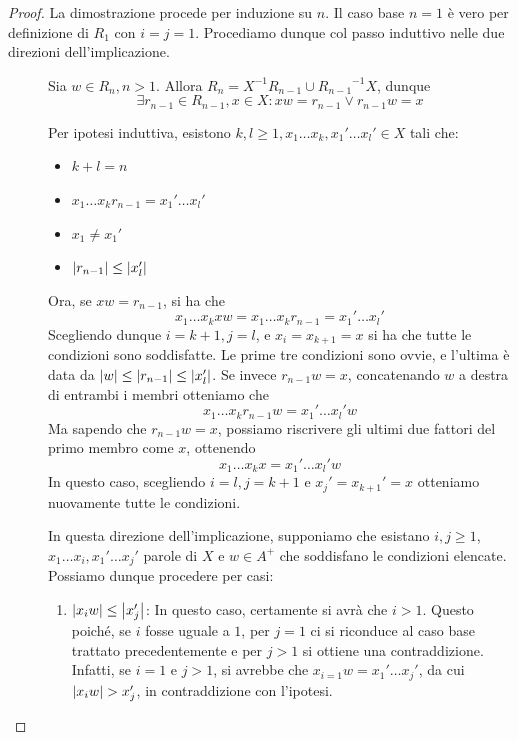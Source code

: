 \begin{proof}
  La dimostrazione procede per induzione su \(n\).
  Il caso base \(n=1\) è vero per definizione di \(R_1\) con \(i = j = 1\).
  Procediamo dunque col passo induttivo nelle due direzioni dell'implicazione.
  \begin{description}
    \item[\q{\(\implies\)}] 
      Sia \(w \in R_n, n>1\). Allora \(R_n = X^{-1}R_{n-1} \cup {R_{n-1}}^{-1}X\), dunque
      \[\exists r_{n-1} \in R_{n-1}, x \in X: xw=r_{n-1} \lor r_{n-1}w=x\]

      Per ipotesi induttiva, esistono \(k,l \geq 1, x_1\ldots x_k,x_1'\ldots x_l' \in X\) tali che:
      \begin{itemize}
        \item \(k+l=n\)
        \item \(x_1\ldots x_k r_{n-1} = x_1'\ldots x_l'\)
        \item \(x_1 \neq x_1'\)
        \item \(\left|r_{n-1}\right| \leq \left|x_l'\right|\)
      \end{itemize}
      Ora, se \(xw = r_{n-1}\), si ha che
      \[x_1\ldots x_k xw= x_1\ldots x_k r_{n-1} = x_1'\ldots x_l'\]
      Scegliendo dunque \(i = k+1,j=l\), e \(x_i = x_{k+1} = x\) si ha che tutte le condizioni sono soddisfatte.
      Le prime tre condizioni sono ovvie, e l'ultima è data da \(\left|w\right|\leq\left|r_{n-1}\right|\leq\left|x_l'\right|\).
      Se invece \(r_{n-1}w = x\),  concatenando \(w\) a destra di entrambi i membri otteniamo che
      \[x_1\ldots x_k r_{n-1} w = x_1'\ldots x_l' w\]
      Ma sapendo che \(r_{n-1}w = x\), possiamo riscrivere gli ultimi due fattori del primo membro come \(x\), ottenendo
      \[x_1\ldots x_k x = x_1'\ldots x_l' w\]
      In questo caso, scegliendo \(i = l,j=k+1\) e \(x_j' = x_{k+1}' = x\) otteniamo nuovamente tutte le condizioni.
    \item[\q{\(\impliedby\)}]
      In questa direzione dell'implicazione, supponiamo che esistano \(i,j \geq 1\), \(x_1\ldots x_i,x_1'\ldots x_j'\) parole di \(X\) e \(w\in A^+\) che soddisfano le condizioni elencate.
      Possiamo dunque procedere per casi:
      \begin{enumerate}
        \item \(\left|x_{i}w\right| \leq \left|x_j'\right|\):
          In questo caso, certamente si avrà che \(i>1\). Questo poiché, se \(i\) fosse uguale a \(1\), per \(j=1\) ci si riconduce al caso base trattato precedentemente e per \(j>1\) si ottiene una contraddizione.
          Infatti, se \(i=1\) e \(j>1\), si avrebbe che \(x_{i=1} w = x_1'\ldots x_j'\), da cui \(\left|x_{i}w\right| > x_j'\), in contraddizione con l'ipotesi.


\end{enumerate}
\end{description}
\end{proof}
